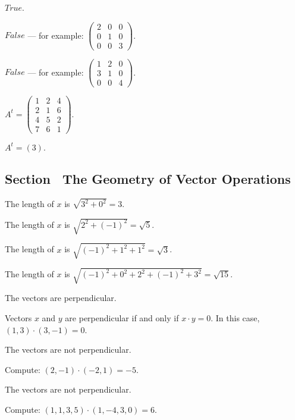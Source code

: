 \documentclass{ximera}
\begin{document}
 $True$.

 $False$ --- for example:
$\left(\begin{array}{ccc}
2 & 0 & 0 \\
0 & 1 & 0 \\
0 & 0 & 3 \end{array}\right)$.

 $False$ --- for example:
$\left(\begin{array}{ccc}
1 & 2 & 0 \\
3 & 1 & 0 \\
0 & 0 & 4
\end{array}\right)$.

 \ans $A^t =
\left(\begin{array}{rrr}
1 & 2 & 4 \\
2 & 1 & 6 \\
4 & 5 & 2 \\
7 & 6 & 1
\end{array}\right).$

 \ans $A^t = (3).$



\subsection*{Section~\protect{\ref{S:1.4}} The Geometry of Vector Operations}

 \ans The length of $x$ is $\sqrt{3^2 + 0^2} = 3$.

 \ans The length of $x$ is $\sqrt{2^2 + (-1)^2} = \sqrt{5}$.

 \ans The length of $x$ is $\sqrt{(-1)^2 + 1^2 + 1^2} =
\sqrt{3}$.

 \ans The length of $x$ is $\sqrt{(-1)^2 + 0^2 + 2^2 +
(-1)^2 + 3^2} = \sqrt{15}$.

\newpage
{} \ans The vectors are perpendicular.

\soln Vectors $x$ and $y$ are perpendicular if and only if $x \cdot y = 0$.
In this case, $(1,3) \cdot (3,-1) = 0$.

 \ans The vectors are not perpendicular.

\soln Compute: $(2,-1) \cdot (-2,1) = -5$.

 \ans The vectors are not perpendicular.

\soln Compute: $(1,1,3,5) \cdot (1,-4,3,0) = 6$.
\end{document}
